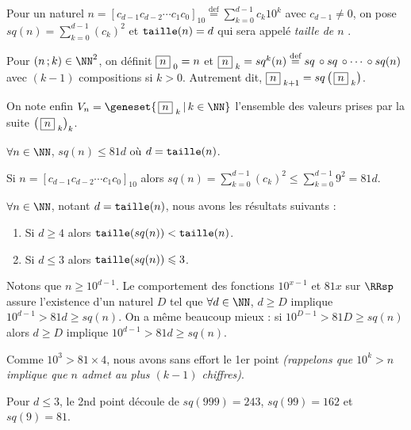 Pour un naturel 
$\displaystyle      n = \left[ c_{d-1} c_{d-2} \cdots c_1 c_0 \right]_{10} 
\stackrel{\text{def}}{=} \sum_{k=0}^{d-1} c_k 10^k$
avec $c_{d-1} \neq 0$,
on pose
$\displaystyle sq(n) = \sum_{k=0}^{d-1} (c_k)^2$
et
$\operatorname{\text{\normalfont\texttt{taille}}}(n) = d$ qui sera appelé \emph{\og taille de $n$ \fg}.

\medskip

Pour $(n \,; k) \in \NN^2$, on définit 
$  \fbox{$n$}_{\,\,0} = n$
et
$  \fbox{$n$}_{\,\,k} = sq^k(n)
\stackrel{\text{def}}{=} sq \,\circ sq \,\circ \cdots \,\circ sq(n)$ avec $(k-1)$ compositions si $k > 0$.
Autrement dit,
$\fbox{$n$}_{\,\,k+1} = sq \left( \, \fbox{$n$}_{\,\,k} \right)$.

\medskip

On note enfin
$V_n = \geneset{ \, \sqseq{n}{k} \, | \, k \in \NN }$
l'ensemble des valeurs prises par la suite $\left( \, \fbox{$n$}_{\,\,k} \right)_k$.



\medskip

\begin{fact}
	$\forall n \in \NN$, $sq(n) \leqslant 81 d$ où $d = \operatorname{\text{\normalfont\texttt{taille}}}(n)$.
\end{fact}

\begin{proof*}
	Si $n = [c_{d-1} c_{d-2} \cdots c_1 c_0]_{10}$
	alors 
	$\displaystyle sq(n) = \sum_{k=0}^{d-1} (c_k)^2 \leqslant \sum_{k=0}^{d-1} 9^2 = 81 d $.
\end{proof*}



\medskip

\begin{fact}
	$\forall n \in \NN$, notant $d = \operatorname{\text{\normalfont\texttt{taille}}}(n)$, nous avons les résultats suivants :
	
	\begin{enumerate}
		\item Si $d \geqslant 4$ alors $\operatorname{\text{\normalfont\texttt{taille}}}(sq(n)) < \operatorname{\text{\normalfont\texttt{taille}}}(n)$.
		
		\item Si $d \leqslant 3$ alors $\operatorname{\text{\normalfont\texttt{taille}}}(sq(n)) \leqslant 3$.
	\end{enumerate}
\end{fact}

\begin{proof*}
	Notons que $n \geqslant 10^{d-1}$.
	Le comportement des fonctions $10^{x-1}$ et $81x$ sur $\RRsp$ assure l'existence d'un naturel $D$ tel que $\forall d \in \NN$, $d \geqslant D$ implique $10^{d-1} > 81d \geqslant sq(n)$. On a même beaucoup mieux : si $10^{D-1} > 81D \geqslant sq(n)$ alors $d \geqslant D$ implique $10^{d-1} > 81d \geqslant sq(n)$.
	
	\medskip
	
	Comme $10^3 > 81 \times 4$, nous avons sans effort le 1er point \emph{(rappelons que $10^k > n$ implique que $n$ admet au plus $(k-1)$ chiffres)}.
	
	\medskip
	
	Pour $d \leqslant 3$, le 2nd point découle de $sq(999) = 243$, $sq(99) = 162$ et $sq(9) = 81$.
\end{proof*}



